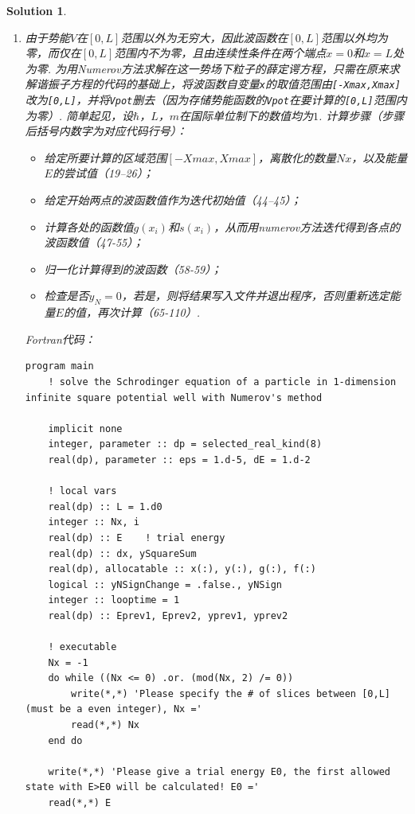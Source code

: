 \documentclass[UTF8,10pt,a4paper]{article}
\theoremstyle{Problem}
\theoremstyle{Solution}
\newtheorem*{sol}{Solution}
\begin{document}
\begin{sol}
    \begin{enumerate}
        \item[(a)] 由于势能$V$在$[0,L]$范围以外为无穷大，因此波函数在$[0,L]$范围以外均为零，而仅在$[0,L]$范围内不为零，且由连续性条件在两个端点$x=0$和$x=L$处为零. 为用Numerov方法求解在这一势场下粒子的薛定谔方程，只需在原来求解谐振子方程的代码的基础上，将波函数自变量\verb|x|的取值范围由\verb|[-Xmax,Xmax]|改为\verb|[0,L]|，并将\verb|Vpot|删去（因为存储势能函数的\verb|Vpot|在要计算的\verb|[0,L]|范围内为零）. 简单起见，设$\hbar$，$L$，$m$在国际单位制下的数值均为$1$. 计算步骤（步骤后括号内数字为对应代码行号）：
              \begin{itemize}
                  \item 给定所要计算的区域范围$[-Xmax,Xmax]$，离散化的数量$Nx$，以及能量$E$的尝试值（19--26）；
                  \item 给定开始两点的波函数值作为迭代初始值（44--45）；
                  \item 计算各处的函数值$g(x_i)$和$s(x_i)$，从而用numerov方法迭代得到各点的波函数值（47-55）；
                  \item 归一化计算得到的波函数（58-59）；
                  \item 检查是否$y_N=0$，若是，则将结果写入文件并退出程序，否则重新选定能量$E$的值，再次计算（65-110）.
              \end{itemize}
              Fortran代码：
              \begin{lstlisting}
program main
    ! solve the Schrodinger equation of a particle in 1-dimension infinite square potential well with Numerov's method

    implicit none
    integer, parameter :: dp = selected_real_kind(8)
    real(dp), parameter :: eps = 1.d-5, dE = 1.d-2

    ! local vars
    real(dp) :: L = 1.d0
    integer :: Nx, i
    real(dp) :: E    ! trial energy
    real(dp) :: dx, ySquareSum
    real(dp), allocatable :: x(:), y(:), g(:), f(:)
    logical :: yNSignChange = .false., yNSign
    integer :: looptime = 1
    real(dp) :: Eprev1, Eprev2, yprev1, yprev2

    ! executable
    Nx = -1
    do while ((Nx <= 0) .or. (mod(Nx, 2) /= 0))
        write(*,*) 'Please specify the # of slices between [0,L] (must be a even integer), Nx ='
        read(*,*) Nx
    end do

    write(*,*) 'Please give a trial energy E0, the first allowed state with E>E0 will be calculated! E0 ='
    read(*,*) E


\end{lstlisting}
\end{enumerate}
\end{sol}
\end{document}
